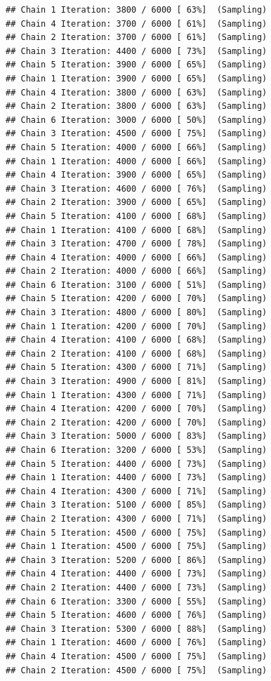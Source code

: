 \documentclass[
]{article}
\begin{document}
\begin{verbatim}
## Chain 1 Iteration: 3800 / 6000 [ 63%]  (Sampling) 
## Chain 4 Iteration: 3700 / 6000 [ 61%]  (Sampling) 
## Chain 2 Iteration: 3700 / 6000 [ 61%]  (Sampling) 
## Chain 3 Iteration: 4400 / 6000 [ 73%]  (Sampling) 
## Chain 5 Iteration: 3900 / 6000 [ 65%]  (Sampling) 
## Chain 1 Iteration: 3900 / 6000 [ 65%]  (Sampling) 
## Chain 4 Iteration: 3800 / 6000 [ 63%]  (Sampling) 
## Chain 2 Iteration: 3800 / 6000 [ 63%]  (Sampling) 
## Chain 6 Iteration: 3000 / 6000 [ 50%]  (Sampling) 
## Chain 3 Iteration: 4500 / 6000 [ 75%]  (Sampling) 
## Chain 5 Iteration: 4000 / 6000 [ 66%]  (Sampling) 
## Chain 1 Iteration: 4000 / 6000 [ 66%]  (Sampling) 
## Chain 4 Iteration: 3900 / 6000 [ 65%]  (Sampling) 
## Chain 3 Iteration: 4600 / 6000 [ 76%]  (Sampling) 
## Chain 2 Iteration: 3900 / 6000 [ 65%]  (Sampling) 
## Chain 5 Iteration: 4100 / 6000 [ 68%]  (Sampling) 
## Chain 1 Iteration: 4100 / 6000 [ 68%]  (Sampling) 
## Chain 3 Iteration: 4700 / 6000 [ 78%]  (Sampling) 
## Chain 4 Iteration: 4000 / 6000 [ 66%]  (Sampling) 
## Chain 2 Iteration: 4000 / 6000 [ 66%]  (Sampling) 
## Chain 6 Iteration: 3100 / 6000 [ 51%]  (Sampling) 
## Chain 5 Iteration: 4200 / 6000 [ 70%]  (Sampling) 
## Chain 3 Iteration: 4800 / 6000 [ 80%]  (Sampling) 
## Chain 1 Iteration: 4200 / 6000 [ 70%]  (Sampling) 
## Chain 4 Iteration: 4100 / 6000 [ 68%]  (Sampling) 
## Chain 2 Iteration: 4100 / 6000 [ 68%]  (Sampling) 
## Chain 5 Iteration: 4300 / 6000 [ 71%]  (Sampling) 
## Chain 3 Iteration: 4900 / 6000 [ 81%]  (Sampling) 
## Chain 1 Iteration: 4300 / 6000 [ 71%]  (Sampling) 
## Chain 4 Iteration: 4200 / 6000 [ 70%]  (Sampling) 
## Chain 2 Iteration: 4200 / 6000 [ 70%]  (Sampling) 
## Chain 3 Iteration: 5000 / 6000 [ 83%]  (Sampling) 
## Chain 6 Iteration: 3200 / 6000 [ 53%]  (Sampling) 
## Chain 5 Iteration: 4400 / 6000 [ 73%]  (Sampling) 
## Chain 1 Iteration: 4400 / 6000 [ 73%]  (Sampling) 
## Chain 4 Iteration: 4300 / 6000 [ 71%]  (Sampling) 
## Chain 3 Iteration: 5100 / 6000 [ 85%]  (Sampling) 
## Chain 2 Iteration: 4300 / 6000 [ 71%]  (Sampling) 
## Chain 5 Iteration: 4500 / 6000 [ 75%]  (Sampling) 
## Chain 1 Iteration: 4500 / 6000 [ 75%]  (Sampling) 
## Chain 3 Iteration: 5200 / 6000 [ 86%]  (Sampling) 
## Chain 4 Iteration: 4400 / 6000 [ 73%]  (Sampling) 
## Chain 2 Iteration: 4400 / 6000 [ 73%]  (Sampling) 
## Chain 6 Iteration: 3300 / 6000 [ 55%]  (Sampling) 
## Chain 5 Iteration: 4600 / 6000 [ 76%]  (Sampling) 
## Chain 3 Iteration: 5300 / 6000 [ 88%]  (Sampling) 
## Chain 1 Iteration: 4600 / 6000 [ 76%]  (Sampling) 
## Chain 4 Iteration: 4500 / 6000 [ 75%]  (Sampling) 
## Chain 2 Iteration: 4500 / 6000 [ 75%]  (Sampling) 

\end{verbatim}
\end{document}
